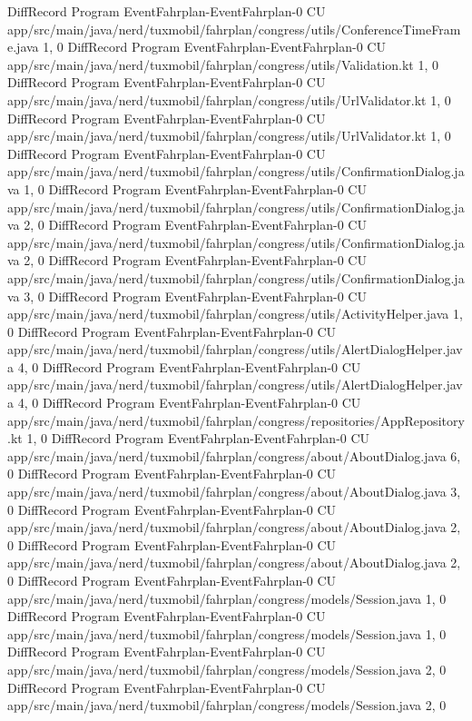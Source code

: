 DiffRecord Program EventFahrplan-EventFahrplan-0 CU app/src/main/java/nerd/tuxmobil/fahrplan/congress/utils/ConferenceTimeFrame.java  {1, 0}
DiffRecord Program EventFahrplan-EventFahrplan-0 CU app/src/main/java/nerd/tuxmobil/fahrplan/congress/utils/Validation.kt  {1, 0}
DiffRecord Program EventFahrplan-EventFahrplan-0 CU app/src/main/java/nerd/tuxmobil/fahrplan/congress/utils/UrlValidator.kt  {1, 0}
DiffRecord Program EventFahrplan-EventFahrplan-0 CU app/src/main/java/nerd/tuxmobil/fahrplan/congress/utils/UrlValidator.kt  {1, 0}
DiffRecord Program EventFahrplan-EventFahrplan-0 CU app/src/main/java/nerd/tuxmobil/fahrplan/congress/utils/ConfirmationDialog.java  {1, 0}
DiffRecord Program EventFahrplan-EventFahrplan-0 CU app/src/main/java/nerd/tuxmobil/fahrplan/congress/utils/ConfirmationDialog.java  {2, 0}
DiffRecord Program EventFahrplan-EventFahrplan-0 CU app/src/main/java/nerd/tuxmobil/fahrplan/congress/utils/ConfirmationDialog.java  {2, 0}
DiffRecord Program EventFahrplan-EventFahrplan-0 CU app/src/main/java/nerd/tuxmobil/fahrplan/congress/utils/ConfirmationDialog.java  {3, 0}
DiffRecord Program EventFahrplan-EventFahrplan-0 CU app/src/main/java/nerd/tuxmobil/fahrplan/congress/utils/ActivityHelper.java  {1, 0}
DiffRecord Program EventFahrplan-EventFahrplan-0 CU app/src/main/java/nerd/tuxmobil/fahrplan/congress/utils/AlertDialogHelper.java  {4, 0}
DiffRecord Program EventFahrplan-EventFahrplan-0 CU app/src/main/java/nerd/tuxmobil/fahrplan/congress/utils/AlertDialogHelper.java  {4, 0}
DiffRecord Program EventFahrplan-EventFahrplan-0 CU app/src/main/java/nerd/tuxmobil/fahrplan/congress/repositories/AppRepository.kt  {1, 0}
DiffRecord Program EventFahrplan-EventFahrplan-0 CU app/src/main/java/nerd/tuxmobil/fahrplan/congress/about/AboutDialog.java  {6, 0}
DiffRecord Program EventFahrplan-EventFahrplan-0 CU app/src/main/java/nerd/tuxmobil/fahrplan/congress/about/AboutDialog.java  {3, 0}
DiffRecord Program EventFahrplan-EventFahrplan-0 CU app/src/main/java/nerd/tuxmobil/fahrplan/congress/about/AboutDialog.java  {2, 0}
DiffRecord Program EventFahrplan-EventFahrplan-0 CU app/src/main/java/nerd/tuxmobil/fahrplan/congress/about/AboutDialog.java  {2, 0}
DiffRecord Program EventFahrplan-EventFahrplan-0 CU app/src/main/java/nerd/tuxmobil/fahrplan/congress/models/Session.java  {1, 0}
DiffRecord Program EventFahrplan-EventFahrplan-0 CU app/src/main/java/nerd/tuxmobil/fahrplan/congress/models/Session.java  {1, 0}
DiffRecord Program EventFahrplan-EventFahrplan-0 CU app/src/main/java/nerd/tuxmobil/fahrplan/congress/models/Session.java  {2, 0}
DiffRecord Program EventFahrplan-EventFahrplan-0 CU app/src/main/java/nerd/tuxmobil/fahrplan/congress/models/Session.java  {2, 0}
